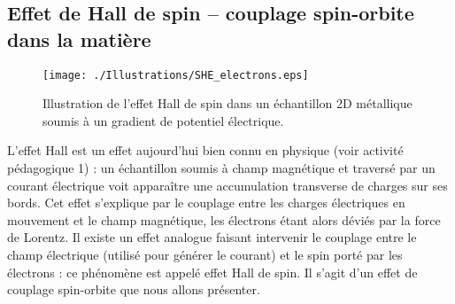 \documentclass[a4paper,11pt]{article} %
\begin{document}
	
	\subsection{Effet de Hall de spin -- couplage spin-orbite dans la matière}
	
	\begin{figure}[h]
		\centering
		\begin{minipage}[c]{0.85\linewidth}
			\centering
			\texttt{[image: ./Illustrations/SHE\_electrons.eps]}
			\caption{Illustration de l'effet Hall de spin dans un échantillon 2D métallique soumis à un gradient de potentiel électrique.}
			\label{fig:spin-Hall-effect}
		\end{minipage}
	\end{figure}
	
	L'effet Hall est un effet aujourd'hui bien connu en physique (voir activité pédagogique 1) : un échantillon soumis à champ magnétique et traversé par un courant électrique voit apparaître une accumulation transverse de charges sur ses bords. Cet effet s'explique par le couplage entre les charges électriques en mouvement et le champ magnétique, les électrons étant alors déviés par la force de Lorentz. Il existe un effet analogue faisant intervenir le couplage entre le champ électrique (utilisé pour générer le courant) et le spin porté par les électrons : ce phénomène est appelé effet Hall de spin. Il s'agit d'un effet de couplage spin-orbite que nous allons présenter.\\ 
	
\end{document}
